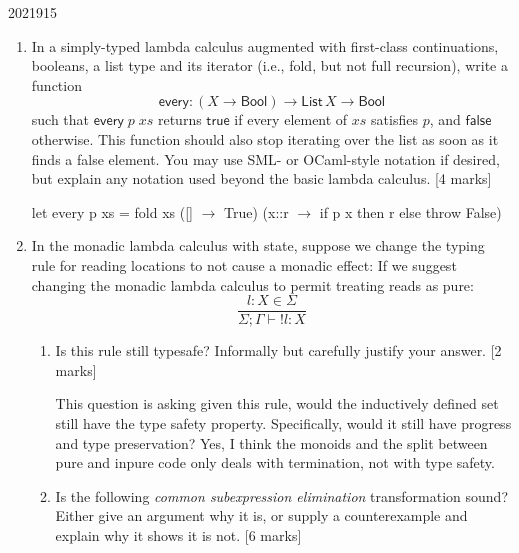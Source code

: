 \documentclass[10pt,\jkfside,a4paper]{article}
\newcommand{\answer}[1]{
    \begin{tcolorbox}[colframe=black, colback=white, sharp corners, boxrule=0.2mm, breakable]
        #1
    \end{tcolorbox}
}
\newcommand{\qmarks}[1]{\hspace*{\fill}[#1]}
\begin{document}
\begin{examquestion}{2021}{9}{15}
    \begin{enumerate}
        \item
            In a simply-typed lambda calculus augmented with first-class continuations,
            booleans, a list type and its iterator (i.e., fold, but not full recursion),
            write a function
            \[
                \mathsf{every} : (X \to \mathsf{Bool}) \to \mathsf{List}\,X \to \mathsf{Bool}
            \]
            such that $\mathsf{every}\;p\;\mathit{xs}$ returns $\mathsf{true}$ if every
            element of $\mathit{xs}$ satisfies $p$, and $\mathsf{false}$ otherwise. This
            function should also stop iterating over the list as soon as it finds a false
            element. You may use SML- or OCaml-style notation if desired, but explain any
            notation used beyond the basic lambda calculus. \qmarks{4 marks}

            \answer{ 
                let every p xs = fold xs ([] $\to$ True) (x::r $\to$ if p x then r else throw False)
            }

        \item
            In the monadic lambda calculus with state, suppose we change the typing rule
            for reading locations to not cause a monadic effect: If we suggest changing
            the monadic lambda calculus to permit treating reads as pure:
            \[
                \frac{l : X \in \Sigma}{\Sigma; \Gamma \vdash {!}l : X}
            \]
            \begin{enumerate}
                \item
                    Is this rule still typesafe? Informally but carefully justify your
                    answer. \qmarks{2 marks}

                    \answer{ 
                        This question is asking given this rule, would the inductively defined set still have the type safety property. Specifically, would it still have progress and type preservation? Yes, I think the monoids and the split between pure and inpure code only deals with termination, not with type safety. 
                    }

                \item
                    Is the following \emph{common subexpression elimination}
                    transformation sound? Either give an argument why it is, or supply a
                    counterexample and explain why it shows it is not. \qmarks{6 marks}


\end{enumerate}
\end{enumerate}
\end{examquestion}
\end{document}
